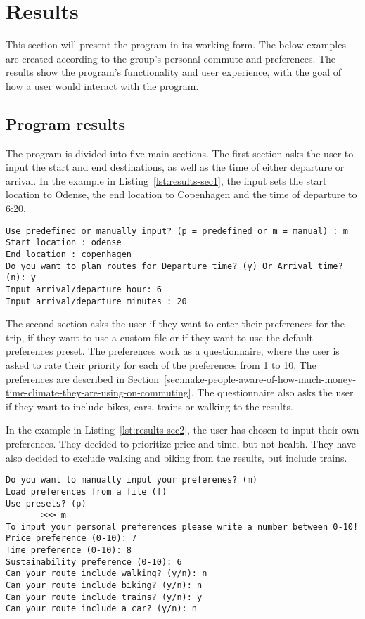 \section{Results}\label{sec:results}

This section will present the program in its working form.
The below examples are created according to the group's personal commute and preferences.
The results show the program's functionality and user experience, with the goal of how a user would interact with the
program.

\subsection{Program results}\label{subsec:program-results}

The program is divided into five main sections.
The first section asks the user to input the start and end destinations, as well as the time of either departure or
arrival.
In the example in Listing~\ref{lst:results-sec1}, the input sets the start location to Odense, the end location to
Copenhagen and the time of departure to 6:20.

\begin{lstlisting}[label={lst:results-sec1}, caption={Basic parameters input.}, captionpos=b, language={}]
Use predefined or manually input? (p = predefined or m = manual) : m
Start location : odense
End location : copenhagen
Do you want to plan routes for Departure time? (y) Or Arrival time? (n): y
Input arrival/departure hour: 6
Input arrival/departure minutes : 20
\end{lstlisting}

The second section asks the user if they want to enter their preferences for the trip, if they want to use a custom
file or if they want to use the default preferences preset.
The preferences work as a questionnaire, where the user is asked to rate their priority for each of the preferences from
1 to 10.
The preferences are described in Section~\ref{sec:make-people-aware-of-how-much-money-time-climate-they-are-using-on-commuting}.
The questionnaire also asks the user if they want to include bikes, cars, trains or walking to the results.

In the example in Listing~\ref{lst:results-sec2}, the user has chosen to input their own preferences.
They decided to prioritize price and time, but not health.
They have also decided to exclude walking and biking from the results, but include trains.

\begin{lstlisting}[label={lst:results-sec2}, caption={Custom preferences input.}, captionpos=b, language={}]
Do you want to manually input your preferenes? (m)
Load preferences from a file (f)
Use presets? (p)
       >>> m
To input your personal preferences please write a number between 0-10!
Price preference (0-10): 7
Time preference (0-10): 8
Sustainability preference (0-10): 6
Can your route include walking? (y/n): n
Can your route include biking? (y/n): n
Can your route include trains? (y/n): y
Can your route include a car? (y/n): n
\end{lstlisting}

